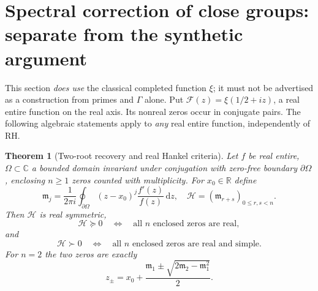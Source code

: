 \documentclass[11pt,reqno]{amsart}
\numberwithin{equation}{section}
\theoremstyle{plain}
\newtheorem{theorem}{Theorem}[section]
\theoremstyle{definition}
\theoremstyle{remark}
\newcommand{\R}{\mathbb R}
\newcommand{\C}{\mathbb C}
\newcommand{\dd}{\,\mathrm d}
\begin{document}
\section{Spectral correction of close groups: separate from the synthetic argument}\label{sec:spectral}
This section \emph{does use} the classical completed function $\xi$; it must not be advertised as a construction from primes and $\Gamma$ alone. Put $\mathcal F(z)=\xi(1/2+iz)$, a real entire function on the real axis. Its nonreal zeros occur in conjugate pairs. The following algebraic statements apply to \emph{any} real entire function, independently of RH.
\begin{theorem}[Two-root recovery and real Hankel criteria]\label{thm:hankel}
Let $f$ be real entire, $\Omega\subset\C$ a bounded domain invariant under conjugation with zero-free boundary $\partial\Omega$, enclosing $n\ge1$ zeros counted with multiplicity. For $x_0\in\R$ define
\begin{equation}\label{eq:moments}
\mathfrak m_j=\frac1{2\pi i}\oint_{\partial\Omega}(z-x_0)^j\frac{f'(z)}{f(z)}\dd z,
\quad \mathcal H=(\mathfrak m_{r+s})_{0\le r,s<n}.
\end{equation}
Then $\mathcal H$ is real symmetric,
\begin{equation}\label{eq:Hpsd}
\mathcal H\succeq0\quad\Longleftrightarrow\quad
\text{all $n$ enclosed zeros are real},
\end{equation}
and
\begin{equation}\label{eq:Hiff}
\mathcal H\succ0\quad\Longleftrightarrow\quad
\text{all $n$ enclosed zeros are real and simple}.
\end{equation}
For $n=2$ the two zeros are exactly
\begin{equation}\label{eq:tworoot}
z_\pm=x_0+\frac{\mathfrak m_1\pm\sqrt{2\mathfrak m_2-\mathfrak m_1^2}}{2}.
\end{equation}
\end{theorem}
\end{document}
